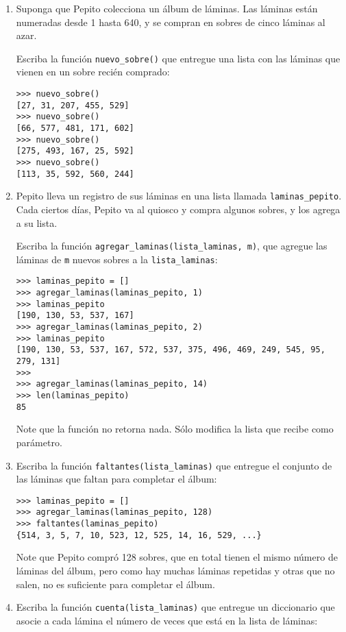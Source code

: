\begin{enumerate}
\item
  Suponga que Pepito colecciona un álbum de láminas. Las láminas están
  numeradas desde 1 hasta 640, y se compran en sobres de cinco láminas
  al azar.

  Escriba la función \lstinline!nuevo_sobre()! que entregue una lista
  con las láminas que vienen en un sobre recién comprado:

\begin{lstlisting}
>>> nuevo_sobre()
[27, 31, 207, 455, 529]
>>> nuevo_sobre()
[66, 577, 481, 171, 602]
>>> nuevo_sobre()
[275, 493, 167, 25, 592]
>>> nuevo_sobre()
[113, 35, 592, 560, 244]
\end{lstlisting}
\item
  Pepito lleva un registro de sus láminas en una lista llamada
  \lstinline!laminas_pepito!. Cada ciertos días, Pepito va al quiosco y
  compra algunos sobres, y los agrega a su lista.

  Escriba la función \lstinline!agregar_laminas(lista_laminas, m)!, que
  agregue las láminas de \lstinline!m! nuevos sobres a la
  \lstinline!lista_laminas!:

\begin{lstlisting}
>>> laminas_pepito = []
>>> agregar_laminas(laminas_pepito, 1)
>>> laminas_pepito
[190, 130, 53, 537, 167]
>>> agregar_laminas(laminas_pepito, 2)
>>> laminas_pepito
[190, 130, 53, 537, 167, 572, 537, 375, 496, 469, 249, 545, 95, 279, 131]
>>>
>>> agregar_laminas(laminas_pepito, 14)
>>> len(laminas_pepito)
85
\end{lstlisting}

  Note que la función no retorna nada. Sólo modifica la lista que recibe
  como parámetro.
\item
  Escriba la función \lstinline!faltantes(lista_laminas)! que entregue
  el conjunto de las láminas que faltan para completar el álbum:

\begin{lstlisting}
>>> laminas_pepito = []
>>> agregar_laminas(laminas_pepito, 128)
>>> faltantes(laminas_pepito)
{514, 3, 5, 7, 10, 523, 12, 525, 14, 16, 529, ...}
\end{lstlisting}

  Note que Pepito compró 128 sobres, que en total tienen el mismo número
  de láminas del álbum, pero como hay muchas láminas repetidas y otras
  que no salen, no es suficiente para completar el álbum.
\item
  Escriba la función \lstinline!cuenta(lista_laminas)! que entregue un
  diccionario que asocie a cada lámina el número de veces que está en la
  lista de láminas:


\end{enumerate}
